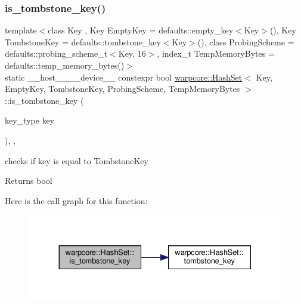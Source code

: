 \subsubsection{\texorpdfstring{is\+\_\+tombstone\+\_\+key()}{is\_tombstone\_key()}}
{\footnotesize\ttfamily template$<$class Key , Key Empty\+Key = defaults\+::empty\+\_\+key$<$\+Key$>$(), Key Tombstone\+Key = defaults\+::tombstone\+\_\+key$<$\+Key$>$(), class Probing\+Scheme  = defaults\+::probing\+\_\+scheme\+\_\+t$<$\+Key, 16$>$, index\+\_\+t Temp\+Memory\+Bytes = defaults\+::temp\+\_\+memory\+\_\+bytes()$>$ \\
static \+\_\+\+\_\+host\+\_\+\+\_\+\+\_\+\+\_\+device\+\_\+\+\_\+ constexpr bool \hyperlink{classwarpcore_1_1HashSet}{warpcore\+::\+Hash\+Set}$<$ Key, Empty\+Key, Tombstone\+Key, Probing\+Scheme, Temp\+Memory\+Bytes $>$\+::is\+\_\+tombstone\+\_\+key (\begin{DoxyParamCaption}\item[{key\+\_\+type}]{key }\end{DoxyParamCaption})\hspace{0.3cm}{\ttfamily [inline]}, {\ttfamily [static]}, {\ttfamily [noexcept]}}



checks if {\ttfamily key} is equal to {\ttfamily Tombstone\+Key} 

\begin{DoxyReturn}{Returns}
{\ttfamily bool} 
\end{DoxyReturn}
Here is the call graph for this function\+:
\nopagebreak
\begin{figure}[H]
\begin{center}
\leavevmode
\includegraphics[width=330pt]{classwarpcore_1_1HashSet_a74f48068d148b071761b1c214501770a_cgraph}
\end{center}
\end{figure}
\mbox{\label{classwarpcore_1_1HashSet_a529de8c2b747588ef825661ba12b4c25}} 
